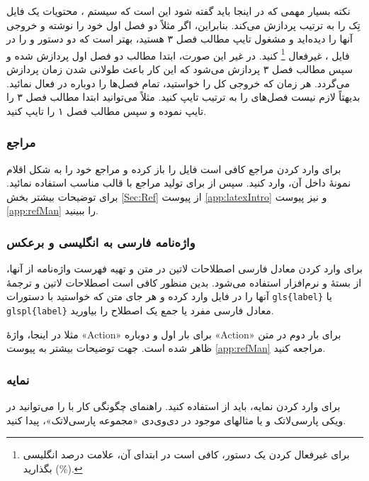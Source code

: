 نکته بسیار مهمی که در اینجا باید گفته شود این است که سیستم \lr{\TeX}، محتویات یک فایل تِک را به ترتیب پردازش می‌کند.  بنابراین، اگر مثلاً  دو فصل اول خود را نوشته و خروجی آنها را دیده‌اید و مشغول تایپ مطالب فصل ۳ هستید، بهتر است
که دو دستور 
\verb!!
و
\verb!!
را در فایل 
،
غیرفعال%
\footnote{
برای غیرفعال کردن یک دستور، کافی است در ابتدای آن، علامت درصد انگلیسی (\%) بگذارید.
}
 کنید. در غیر این صورت، ابتدا مطالب دو فصل اول پردازش شده و سپس مطالب فصل ۳ پردازش می‌شود که این کار باعث طولانی شدن زمان پردازش می‌گردد. هر زمان که خروجی کل \پ را خواستید، تمام فصل‌ها را دوباره در
فعال نمائید.
بدیهتاً لازم نیست فصل‌های \پ را به ترتیب تایپ کنید. مثلاً می‌توانید ابتدا مطالب فصل ۳ را تایپ نموده و سپس مطالب فصل ۱ را تایپ کنید. 
\subsubsection{مراجع}
برای وارد کردن مراجع \پ کافی است فایل 
را باز کرده و مراجع خود را به شکل اقلام نمونهٔ داخل آن، وارد کنید.  سپس از  برای تولید مراجع با قالب مناسب استفاده نمائید. برای توضیحات بیشتر بخش \ref{Sec:Ref} از پیوست \ref{app:latexIntro} و نیز پیوست \ref{app:refMan} را ببینید.

\subsubsection{واژه‌نامه فارسی به انگلیسی و برعکس}
برای وارد کردن معادل فارسی اصطلاحات لاتین در متن و تهیه فهرست واژه‌نامه از آنها، از بستهٔ
و نرم‌افزار
استفاده می‌شود. بدین منظور کافی است اصطلاحات لاتین و ترجمهٔ آنها را در فایل
وارد کرده و هر جای متن که خواستید با دستورات
\verb|gls{label}|
یا \verb|glspl{label}|
معادل فارسی مفرد یا جمع یک اصطلاح را بیاورید.

مثلا در اینجا، واژهٔ
«\gls{Action}»
برای بار اول و دوباره
«\gls{Action}»
برای بار دوم در متن ظاهر شده است.
جهت توضیحات بیشتر به پیوست
\ref{app:refMan}
مراجعه کنید.
\subsubsection{نمایه}
برای وارد کردن نمایه، باید از 
استفاده کنید. 
راهنمای چگونگی کار با 
را می‌توانید در ویکی پارسی‌لاتک و یا مثالهای موجود در دی‌وی‌دی «مجموعه پارسی‌لاتک»، پیدا کنید.

